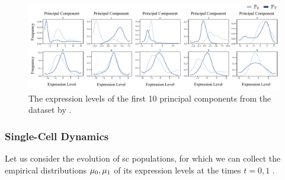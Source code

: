 \begin{figure}[t]
     \centering
	\includegraphics[width=\textwidth]{figures/fig_marginals_schiebinger_pcs_cropped.pdf}
 	\caption{The expression levels of the first 10 principal components from the dataset by \citet{schiebinger2019optimal}.}
	\label{fig:gaussianMain}
\end{figure}

\subsubsection{Single-Cell Dynamics}
\label{sec:gsbflow_cell}


Let us consider the evolution of \acrlong{sc} populations, for which we can collect the empirical distributions $\mu_0,\mu_1$ of its expression levels at the times $t=0,1$ \citep{schiebinger2019optimal,moon2019visualizing}. 

